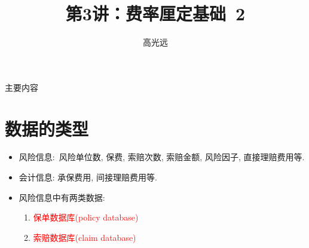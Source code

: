 \documentclass[professionalfont]{beamer}
\title{第3讲：费率厘定基础~2}
\author{高光远}
\institute{中国人民大学~统计学院}
\date{}
\newcommand{\red}[1]{\textcolor{red}{#1}}
\begin{document}
\begin{frame}
	\titlepage
\end{frame}

\begin{frame}{主要内容}
	\tableofcontents
\end{frame}



\section{数据的类型}
	\begin{frame}
	\begin{itemize}
		\item 风险信息:~风险单位数, 保费, 索赔次数, 索赔金额, 风险因子, 直接理赔费用等.
		\item 会计信息: 承保费用, 间接理赔费用等. 
		\item 风险信息中有两类数据: 
		\begin{enumerate}
			\item \red{保单数据库(policy database)}
			\item \red{索赔数据库(claim database)}
			\end{enumerate}
		\end{itemize}	
	\end{frame}
		
\end{document}
